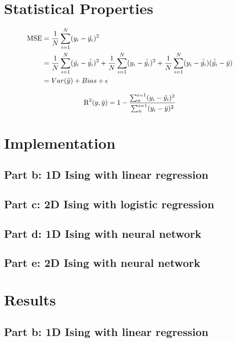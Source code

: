 \documentclass[a4paper,12pt, english]{article}
\begin{document}
\section{Statistical Properties}

\begin{align} \label{eq:MSE}
\textnormal{MSE} &= \frac{1}{N} \sum_{i=1}^N (y_i - \hat{y_i})^2 \\
&= \frac{1}{N} \sum_{i=1}^N (\hat{y_i} - \bar{\hat{y_i}})^2 + \frac{1}{N} \sum_{i=1}^N (y_i - \bar{\hat{y_i}})^2 + \frac{1}{N} \sum_{i=1}^N (y_i - \bar{\hat{y_i}})(\bar{\hat{y_i}} - \hat{y}) \\
&= Var(\hat{y}) + Bias + \epsilon
\end{align}

\begin{equation}
\textnormal{R}^2(y,\hat{y}) = 1 - \frac{\sum_{n}^{i=1} (y_i - \hat{y_i})^2}{\sum_{n}^{i=1}(y_i - \bar{y})^2}
\end{equation}

\section{Implementation}

\subsection{Part b: 1D Ising with linear regression}

\subsection{Part c: 2D Ising with logistic regression}

\subsection{Part d: 1D Ising with neural network}

\subsection{Part e: 2D Ising with neural network}


\section{Results}

\subsection{Part b: 1D Ising with linear regression}
\end{document}
